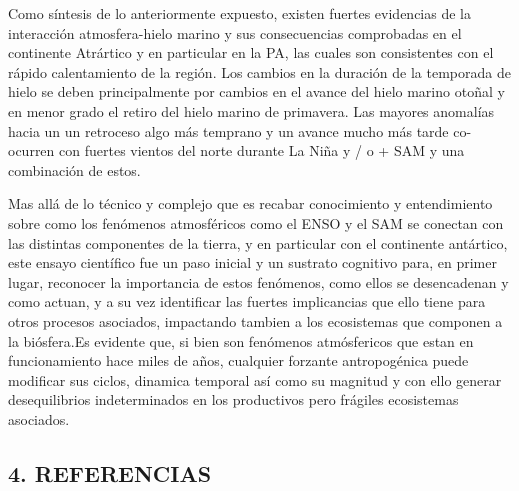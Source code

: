 \documentclass[
]{article}
\begin{document}
Como síntesis de lo anteriormente expuesto, existen fuertes evidencias
de la interacción atmosfera-hielo marino y sus consecuencias comprobadas
en el continente Atrártico y en particular en la PA, las cuales son
consistentes con el rápido calentamiento de la región. Los cambios en la
duración de la temporada de hielo se deben principalmente por cambios en
el avance del hielo marino otoñal y en menor grado el retiro del hielo
marino de primavera. Las mayores anomalías hacia un un retroceso algo
más temprano y un avance mucho más tarde co-ocurren con fuertes vientos
del norte durante La Niña y / o + SAM y una combinación de estos.

Mas allá de lo técnico y complejo que es recabar conocimiento y
entendimiento sobre como los fenómenos atmosféricos como el ENSO y el
SAM se conectan con las distintas componentes de la tierra, y en
particular con el continente antártico, este ensayo científico fue un
paso inicial y un sustrato cognitivo para, en primer lugar, reconocer la
importancia de estos fenómenos, como ellos se desencadenan y como
actuan, y a su vez identificar las fuertes implicancias que ello tiene
para otros procesos asociados, impactando tambien a los ecosistemas que
componen a la biósfera.Es evidente que, si bien son fenómenos
atmósfericos que estan en funcionamiento hace miles de años, cualquier
forzante antropogénica puede modificar sus ciclos, dinamica temporal así
como su magnitud y con ello generar desequilibrios indeterminados en los
productivos pero frágiles ecosistemas asociados.

\pagebreak

\hypertarget{referencias}{%
\subsection*{4. REFERENCIAS}\label{referencias}}
\end{document}
